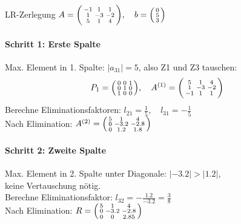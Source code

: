 \begin{example2}[breakable]{LR-Zerlegung}
$A = \begin{psmallmatrix}
-1 & 1 & 1\\
1 & -3 & -2\\
5 & 1 & 4
\end{psmallmatrix}, \quad b = \begin{psmallmatrix}
0\\
5\\
3
\end{psmallmatrix}$

\paragraph{Schritt 1: Erste Spalte}
Max. Element in 1. Spalte: $|a_{31}| = 5$, also Z1 und Z3 tauschen:
$$P_1 = \begin{psmallmatrix}
0 & 0 & 1\\
0 & 1 & 0\\
1 & 0 & 0
\end{psmallmatrix}, \quad A^{(1)} = \begin{psmallmatrix}
5 & 1 & 4\\
1 & -3 & -2\\
-1 & 1 & 1
\end{psmallmatrix}$$
Berechne Eliminationsfaktoren:
$l_{21} = \frac{1}{5}, \quad l_{31} = -\frac{1}{5}$
\vspace{2mm}\\
Nach Elimination:
$A^{(2)} = \begin{psmallmatrix}
5 & 1 & 4\\
0 & -3.2 & -2.8\\
0 & 1.2 & 1.8
\end{psmallmatrix}$

\paragraph{Schritt 2: Zweite Spalte}
Max. Element in 2. Spalte unter Diagonale: $|-3.2| > |1.2|$, \\ keine Vertauschung nötig.
\vspace{2mm}\\
Berechne Eliminationsfaktor:
$l_{32} = -\frac{1.2}{-3.2} = \frac{3}{8}$
\vspace{2mm}\\
Nach Elimination:
$R = \begin{psmallmatrix}
5 & 1 & 4\\
0 & -3.2 & -2.8\\
0 & 0 & 2.85
\end{psmallmatrix}$


\end{example2}

